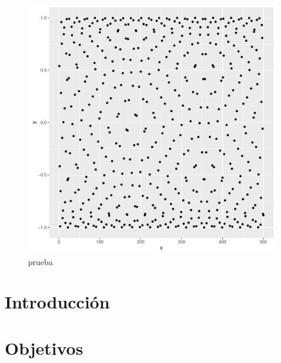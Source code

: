 \documentclass[a4paper,11pt]{book}\usepackage[]{graphicx}\usepackage[]{color}
\makeatletter
\def\maxwidth{ %
  \ifdim\Gin@nat@width>\linewidth
    \linewidth
  \else
    \Gin@nat@width
  \fi
}
\newenvironment{knitrout}{}{} %
\theoremstyle{plain}
\theoremstyle{definition}
\makeatother
\begin{document}
%
%
\tableofcontents
%



\begin{knitrout}
\color{fgcolor}\begin{figure}

{\centering \includegraphics[width=\maxwidth]{figure/prueba-1} 

}

\caption[prueba]{prueba}\label{fig:prueba}
\end{figure}


\end{knitrout}



\chapter{Introducción}


\chapter{Objetivos} 
\end{document}
